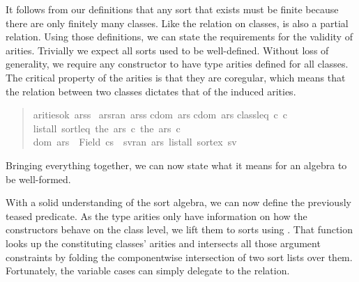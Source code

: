 It follows from our definitions that any sort that exists must be finite because there are only finitely many classes.
Like the relation on classes,  is also a partial relation.
Using those definitions, we can state the requirements for the validity of arities.
Trivially we expect all sorts used to be well-defined.
Without loss of generality, we require any constructor to have type arities defined for all classes.
The critical property of the arities is that they are coregular, which means that the relation between two classes dictates that of the induced arities.

\begin{quote}
\begin{isabelle}
 arities{\isacharunderscore}ok\ arss\ {\isacharequal}\isanewline
{\isacharparenleft}{\isasymforall}ars{\isasymin}ran\ arss{\isachardot}\isanewline
\isaindent{{\isacharparenleft}\ \ \ }{\isacharparenleft}{\isasymforall}cdom\ ars{\isachardot}\isanewline
\isaindent{{\isacharparenleft}\ \ \ {\isacharparenleft}\ \ \ }{\isasymforall}cdom\ ars{\isachardot}\isanewline
\isaindent{{\isacharparenleft}\ \ \ {\isacharparenleft}\ \ \ \ \ \ }class{\isacharunderscore}leq\ c\ c\ {\isasymlongrightarrow}\isanewline
\isaindent{{\isacharparenleft}\ \ \ {\isacharparenleft}\ \ \ \ \ \ }list{\isacharunderscore}all{}\ sort{\isacharunderscore}leq\ {\isacharparenleft}the\ {\isacharparenleft}ars\ c\ {\isacharparenleft}the\ {\isacharparenleft}ars\ c\ {\isasymand}\isanewline
\isaindent{{\isacharparenleft}\ \ \ }dom\ ars\ {\isacharequal}\ Field\ cs\ {\isasymand}\ {\isacharparenleft}{\isasymforall}sv{\isasymin}ran\ ars{\isachardot}\ list{\isacharunderscore}all\ sort{\isacharunderscore}ex\ sv{\isacharparenright}{\isacharparenright}%
\end{isabelle}
\end{quote}

Bringing everything together, we can now state what it means for an algebra to be well-formed.


With a solid understanding of the sort algebra, we can now define the previously teased  predicate.
As the type arities only have information on how the constructors behave on the class level, we lift them to sorts using .
That function looks up the constituting classes' arities and intersects all those argument constraints by folding the componentwise intersection of two sort lists over them.
Fortunately, the variable cases can simply delegate to the  relation.

